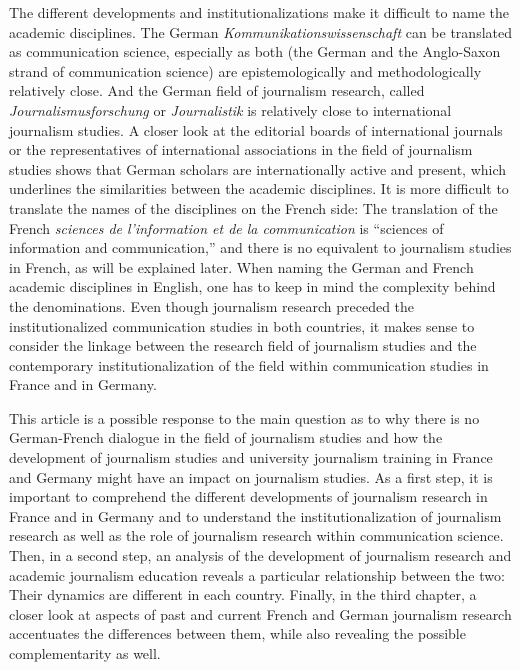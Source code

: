 \documentclass{tufte-handout}
\begin{document}
The different developments and institutionalizations make it difficult
to name the academic disciplines. The German
\emph{Kommunikationswissenschaft} can be translated as communication
science, especially as both (the German and the Anglo-Saxon strand of
communication science) are epistemologically and methodologically
relatively close. And the German field of journalism research, called
\emph{Journalismusforschung} or \emph{Journalistik} is relatively close
to international journalism studies. A closer look at the editorial
boards of international journals or the representatives of international
associations in the field of journalism studies shows that German
scholars are internationally active and present, which underlines the
similarities between the academic disciplines. It is more difficult to
translate the names of the disciplines on the French side: The
translation of the French \emph{sciences de l'information et de la
communication} is ``sciences of information and communication,'' and
there is no equivalent to journalism studies in French, as will be
explained later. When naming the German and French academic disciplines
in English, one has to keep in mind the complexity behind the
denominations. Even though journalism research preceded the
institutionalized communication studies in both countries, it makes
sense to consider the linkage between the research field of journalism
studies and the contemporary institutionalization of the field within
communication studies in France and in Germany.

This article is a possible response to the main question as to why there
is no German-French dialogue in the field of journalism studies and how
the development of journalism studies and university journalism training
in France and Germany might have an impact on journalism studies. As a
first step, it is important to comprehend the different developments of
journalism research in France and in Germany and to understand the
institutionalization of journalism research as well as the role of
journalism research within communication science. Then, in a second
step, an analysis of the development of journalism research and academic
journalism education reveals a particular relationship between the two:
Their dynamics are different in each country. Finally, in the third
chapter, a closer look at aspects of past and current French and German
journalism research accentuates the differences between them, while also
revealing the possible complementarity as well.

\enlargethispage{\baselineskip}
\end{document}
